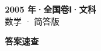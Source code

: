 \documentclass[zihao=-4, a4paper]{ctexart}
\begin{document}
\begin{center}
  {\Large\bfseries 2005 年·全国卷Ⅰ·文科}\\[4pt]
  {\large 数学 · 简答版}
\end{center}
\medskip
{}

\clearpage
{}
\begin{center}{\Large\bfseries 答案速查}\end{center}
\medskip

\end{document}
